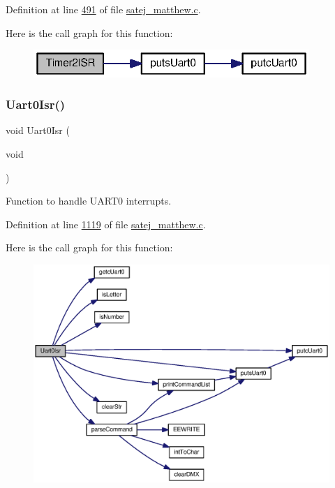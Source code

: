 Definition at line \mbox{\hyperlink{satej__matthew_8c_source_l00491}{491}} of file \mbox{\hyperlink{satej__matthew_8c_source}{satej\+\_\+matthew.\+c}}.

Here is the call graph for this function\+:\nopagebreak
\begin{figure}[H]
\begin{center}
\leavevmode
\includegraphics[width=296pt]{tm4c123gh6pm__startup__ccs_8c_a424b9010ddc61d3484dca1b6af5af5b0_cgraph}
\end{center}
\end{figure}
\mbox{\label{tm4c123gh6pm__startup__ccs_8c_affa7c2cc09d04fc57b05c5644b1c8a68}} 
\subsubsection{\texorpdfstring{Uart0Isr()}{Uart0Isr()}}
{\footnotesize\ttfamily void Uart0\+Isr (\begin{DoxyParamCaption}\item[{void}]{ }\end{DoxyParamCaption})}



Function to handle U\+A\+R\+T0 interrupts. 



Definition at line \mbox{\hyperlink{satej__matthew_8c_source_l01119}{1119}} of file \mbox{\hyperlink{satej__matthew_8c_source}{satej\+\_\+matthew.\+c}}.

Here is the call graph for this function\+:\nopagebreak
\begin{figure}[H]
\begin{center}
\leavevmode
\includegraphics[width=350pt]{tm4c123gh6pm__startup__ccs_8c_affa7c2cc09d04fc57b05c5644b1c8a68_cgraph}
\end{center}
\end{figure}
\mbox{\label{tm4c123gh6pm__startup__ccs_8c_af19c26d9a6dc91ca0e5358bef906f61f}} 

